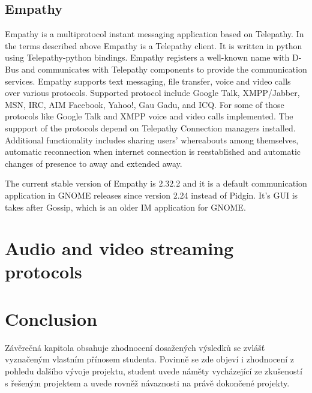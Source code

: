 \section{Empathy}
Empathy is a multiprotocol instant messaging application based on Telepathy. In the terms described above Empathy is a Telepathy client. It is written in python using Telepathy-python bindings. Empathy registers a well-known name with D-Bus and communicates with Telepathy components to provide the communication services. Empathy supports text messaging, file transfer, voice and video calls over various protocols. Supported protocol include Google Talk, XMPP/Jabber, MSN, IRC, AIM Facebook, Yahoo!, Gau Gadu, and ICQ. For some of those protocols like Google Talk and XMPP voice and video calls implemented. The suppport of the protocols depend on Telepathy Connection managers installed. Additional functionality includes sharing users' whereabouts among themselves, automatic reconnection when internet connection is reestablished and automatic changes of presence to away and extended away.\cite{empathyGnome}

The current stable version of Empathy is 2.32.2 and it is a default communication application in GNOME releases since version 2.24 instead of Pidgin. It's GUI is takes after Gossip, which is an older IM application for GNOME. 


\chapter{Audio and video streaming protocols}




\chapter{Conclusion}
Závěrečná kapitola obsahuje zhodnocení dosažených výsledků se zvlášť vyznačeným vlastním přínosem studenta. Povinně se zde objeví i zhodnocení z pohledu dalšího vývoje projektu, student uvede náměty vycházející ze zkušeností s řešeným projektem a uvede rovněž návaznosti na právě dokončené projekty.


